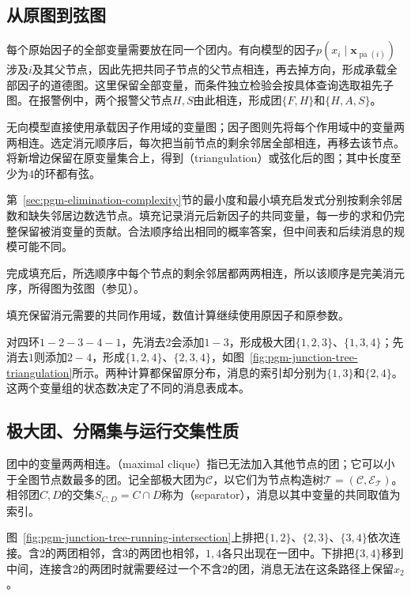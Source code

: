 \subsection{从原图到弦图}
\label{sec:pgm-junction-tree-chordalization}

每个原始因子的全部变量需要放在同一个团内。有向模型的因子$p(x_i\mid\bm{x}_{\operatorname{pa}(i)})$涉及$i$及其父节点，因此先把共同子节点的父节点相连，再去掉方向，形成承载全部因子的道德图。这里保留全部变量，而条件独立检验会按具体查询选取祖先子图。在报警例中，两个报警父节点$H,S$由此相连，形成团$\{F,H\}$和$\{H,A,S\}$。

无向模型直接使用承载因子作用域的变量图；因子图则先将每个作用域中的变量两两相连。选定消元顺序后，每次把当前节点的剩余邻居全部相连，再移去该节点。将新增边保留在原变量集合上，得到（triangulation）或弦化后的图；其中长度至少为$4$的环都有弦。

第~\ref{sec:pgm-elimination-complexity}节的最小度和最小填充启发式分别按剩余邻居数和缺失邻居边数选节点。填充记录消元后新因子的共同变量，每一步的求和仍完整保留被消变量的贡献。合法顺序给出相同的概率答案，但中间表和后续消息的规模可能不同。

完成填充后，所选顺序中每个节点的剩余邻居都两两相连，所以该顺序是完美消元序，所得图为弦图（参见）。

填充保留消元需要的共同作用域，数值计算继续使用原因子和原参数。

对四环$1-2-3-4-1$，先消去$2$会添加$1-3$，形成极大团$\{1,2,3\}$、$\{1,3,4\}$；先消去$1$则添加$2-4$，形成$\{1,2,4\}$、$\{2,3,4\}$，如图~\ref{fig:pgm-junction-tree-triangulation}所示。两种计算都保留原分布，消息的索引却分别为$\{1,3\}$和$\{2,4\}$。这两个变量组的状态数决定了不同的消息表成本。

\subsection{极大团、分隔集与运行交集性质}
\label{sec:pgm-junction-tree-running-intersection}

团中的变量两两相连。（maximal clique）指已无法加入其他节点的团；它可以小于全图节点数最多的团。记全部极大团为$\mathcal C$，以它们为节点构造树$\mathcal T=(\mathcal C,\mathcal E_{\mathcal T})$。相邻团$C,D$的交集$S_{C,D}=C\cap D$称为（separator），消息以其中变量的共同取值为索引。

图~\ref{fig:pgm-junction-tree-running-intersection}上排把$\{1,2\}$、$\{2,3\}$、$\{3,4\}$依次连接。含$2$的两团相邻，含$3$的两团也相邻，$1,4$各只出现在一团中。下排把$\{3,4\}$移到中间，连接含$2$的两团时就需要经过一个不含$2$的团，消息无法在这条路径上保留$x_2$。

